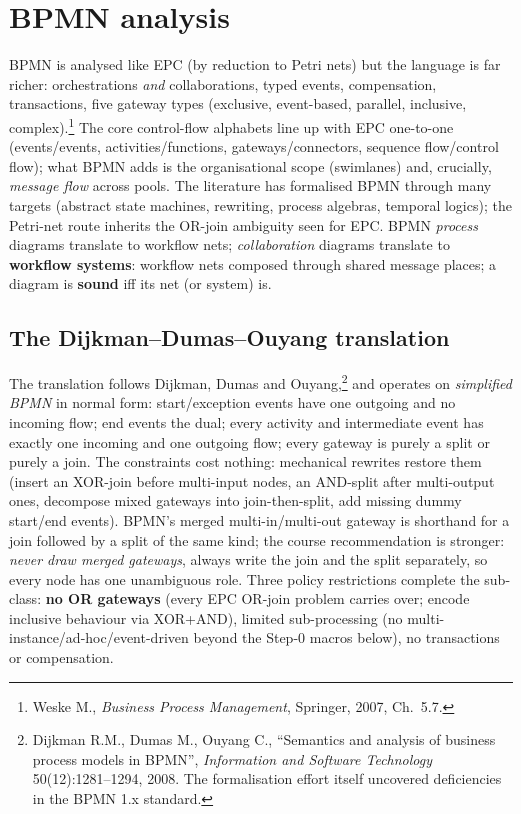 \section{BPMN analysis}

BPMN is analysed like EPC (by reduction to Petri nets) but the language is far richer: orchestrations \emph{and} collaborations, typed events, compensation, transactions, five gateway types (exclusive, event-based, parallel, inclusive, complex).\footnote{Weske M., \emph{Business Process Management}, Springer, 2007, Ch.~5.7.} The core control-flow alphabets line up with EPC one-to-one (events/events, activities/functions, gateways/connectors, sequence flow/control flow); what BPMN adds is the organisational scope (swimlanes) and, crucially, \emph{message flow} across pools. The literature has formalised BPMN through many targets (abstract state machines, rewriting, process algebras, temporal logics); the Petri-net route inherits the OR-join ambiguity seen for EPC. BPMN \emph{process} diagrams translate to workflow nets; \emph{collaboration} diagrams translate to \textbf{workflow systems}: workflow nets composed through shared message places; a diagram is \textbf{sound} iff its net (or system) is.

\subsection{The Dijkman--Dumas--Ouyang translation}

The translation follows Dijkman, Dumas and Ouyang,\footnote{Dijkman R.M., Dumas M., Ouyang C., ``Semantics and analysis of business process models in BPMN'', \emph{Information and Software Technology} 50(12):1281--1294, 2008. The formalisation effort itself uncovered deficiencies in the BPMN 1.x standard.} and operates on \emph{simplified BPMN} in normal form: start/exception events have one outgoing and no incoming flow; end events the dual; every activity and intermediate event has exactly one incoming and one outgoing flow; every gateway is purely a split or purely a join. The constraints cost nothing: mechanical rewrites restore them (insert an XOR-join before multi-input nodes, an AND-split after multi-output ones, decompose mixed gateways into join-then-split, add missing dummy start/end events). BPMN's merged multi-in/multi-out gateway is shorthand for a join followed by a split of the same kind; the course recommendation is stronger: \emph{never draw merged gateways}, always write the join and the split separately, so every node has one unambiguous role. Three policy restrictions complete the sub-class: \textbf{no OR gateways} (every EPC OR-join problem carries over; encode inclusive behaviour via XOR+AND), limited sub-processing (no multi-instance/ad-hoc/event-driven beyond the Step-0 macros below), no transactions or compensation.

